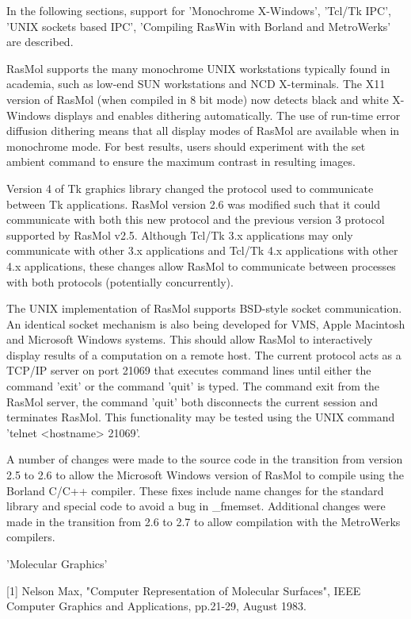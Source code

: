 In the following sections, support for
'Monochrome X-Windows',
'Tcl/Tk IPC',
'UNIX sockets based IPC',
'Compiling RasWin with Borland and MetroWerks'
are described.

RasMol supports the many
monochrome UNIX workstations typically found in academia, such as low-end
SUN workstations and NCD X-terminals. The X11 version of RasMol (when
compiled in 8 bit mode) now detects black and white X-Windows displays and
enables dithering automatically. The use of run-time error diffusion dithering
means that all display modes of RasMol are available when in monochrome
mode. For best results, users should experiment with the set ambient
command to ensure the maximum contrast in resulting images.

Version 4 of Tk
graphics library changed the protocol used to communicate between Tk
applications. RasMol version 2.6 was modified such that it could
communicate with both this new protocol and the previous version 3 protocol
supported by RasMol v2.5. Although Tcl/Tk 3.x applications may only
communicate with other 3.x applications and Tcl/Tk 4.x applications with other
4.x applications, these changes allow RasMol to communicate between
processes with both protocols (potentially concurrently).

The UNIX implementation of RasMol
supports BSD-style socket communication. An identical socket mechanism is
also being developed for VMS, Apple Macintosh and Microsoft Windows
systems. This should allow RasMol to interactively display results of a
computation on a remote host. The current protocol acts as a TCP/IP server on
port 21069 that executes command lines until either the command
'exit'
or the
command
'quit'
is typed. The command
exit
from the RasMol server, the command
'quit'
both disconnects the current
session and terminates RasMol. This functionality may be tested using the
UNIX command
'telnet <hostname> 21069'.

A number of changes were made to the
source code in the transition from version 2.5 to 2.6 to allow
the Microsoft Windows version of RasMol to compile
using the Borland C/C++ compiler. These fixes include name changes for the
standard library and special code to avoid a bug in _fmemset.
Additional changes were made in the transition from 2.6 to 2.7 to
allow compilation with the MetroWerks compilers.

'Molecular Graphics'

[1] Nelson Max, "Computer Representation of Molecular Surfaces", IEEE
Computer Graphics and Applications, pp.21-29, August 1983.

